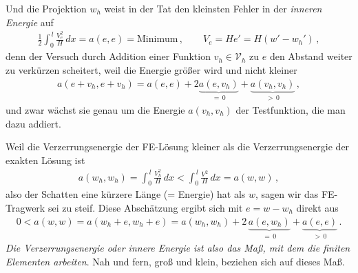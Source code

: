 Und die Projektion $w_h$ weist in der Tat den kleinsten Fehler in der {\em inneren Energie} auf
\begin{align}
\frac{1}{2} \int_0^{\,l} \frac{V_e^2}{H} \,dx = a(e,e) = \mbox{Minimum}\,, \qquad V_e = H e' = H
(w' -  w_h') \,,
\end{align}
denn der Versuch durch Addition einer Funktion $v_h \in \mathcal{V}_h$ zu $e$ den Abstand weiter zu verk\"{u}rzen scheitert, weil die Energie gr\"{o}{\ss}er wird und nicht kleiner
\begin{align}\label{E7Proof1}
a(e + v_h,e + v_h) = a(e,e) + 2\underbrace{a(e,v_h)}_{=\, 0} +
\underbrace{a(v_h,v_h)}_{>\, 0}\,,
\end{align}
und zwar w\"{a}chst sie genau um die Energie $a(v_h,v_h)$ der Testfunktion, die man dazu addiert.

Weil die Verzerrungsenergie der FE-L\"{o}sung kleiner als die Verzerrungsenergie der exakten L\"{o}sung ist
\begin{align}\label{UngA12}
a(w_h,w_h) = \int_0^{\,l} \frac{V_h^2}{H}\,dx < \int_0^{\,l} \frac{V^2}{H}\,dx =
a(w,w)\,,
\end{align}
also der Schatten eine k\"{u}rzere  L\"{a}nge (= Energie) hat als $w$, sagen wir das FE-Tragwerk sei zu steif. Diese Absch\"{a}tzung ergibt sich mit $e = w - w_h$ direkt aus
\begin{align}
0 < a(w,w) = a(w_h + e,w_h + e) = a(w_h,w_h) + 2\,\underbrace{a(e,w_h)}_{=\, 0} +
\underbrace{a(e,e)}_{>\, 0}\,.
\end{align}
{\em Die Verzerrungsenergie oder innere Energie ist also das Ma{\ss}, mit dem die finiten Elementen arbeiten\/}. Nah und fern, gro{\ss} und klein, beziehen sich auf dieses Ma{\ss}.

